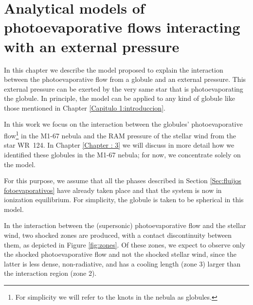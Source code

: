 \documentclass{book}
\begin{document}

\chapter{Analytical models of photoevaporative flows interacting
  with an external pressure}
\label{Chapter : Modelo}

In this chapter we describe the model proposed to explain the
interaction between the photoevaporative flow from a globule and an
external pressure. This external pressure can be exerted by the very
same star that is photoevaporating the globule. In principle, the
model can be applied to any kind of globule like those mentioned in
Chapter \ref{Capitulo 1:introduccion}.

In this work we focus on the interaction between the globules’
photoevaporative flow\footnote{For simplicity we will refer to the
knots in the nebula as globules.} in the M1-67 nebula and the RAM
pressure of the stellar wind from the star WR~124. In Chapter
\ref{Chapter : 3} we will discuss in more detail how we identified
these globules in the M1-67 nebula; for now, we concentrate solely on
the model.

For this purpose, we assume that all the phases described in Section
\ref{Sec:fluijos fotoevaporativos} have already taken place and that
the system is now in ionization equilibrium. For simplicity, the
globule is taken to be spherical in this model.

In the interaction between the (supersonic) photoevaporative flow and
the stellar wind, two shocked zones are produced, with a contact
discontinuity between them, as depicted in Figure \ref{fig:zones}. Of
these zones, we expect to observe only the shocked photoevaporative
flow and not the shocked stellar wind, since the latter is less dense,
non-radiative, and has a cooling length (zone 3) larger than the
interaction region (zone 2).
\end{document}
